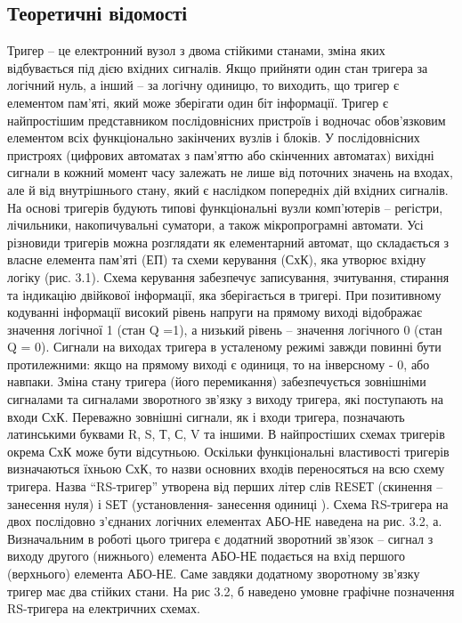\documentclass[12pt]{extarticle}
\begin{document}
\subsection*{Теоретичні відомості}
Тригер – це електронний вузол з двома стійкими станами, зміна яких
відбувається під дією вхідних сигналів. Якщо прийняти один стан тригера за
логічний нуль, а інший – за логічну одиницю, то виходить, що тригер є елементом
пам’яті, який може зберігати один біт інформації. Тригер є найпростішим
представником послідовнісних пристроїв і водночас обов’язковим елементом всіх
функціонально закінчених вузлів і блоків.
У послідовнісних пристроях (цифрових автоматах з пам’яттю або скінченних
автоматах) вихідні сигнали в кожний момент часу залежать не лише від поточних
значень на входах, але й від внутрішнього стану, який є наслідком попередніх дій
вхідних сигналів.
На основі тригерів будують типові функціональні вузли комп’ютерів –
регістри, лічильники, накопичувальні суматори, а також мікропрограмні автомати.
Усі різновиди тригерів можна розглядати як елементарний автомат, що
складається з власне елемента пам’яті (ЕП) та схеми керування (СхК), яка утворює
вхідну логіку (рис. 3.1). Схема керування забезпечує записування, зчитування,
стирання та індикацію двійкової інформації, яка зберігається в тригері.
При позитивному кодуванні інформації високий рівень напруги на прямому виході
відображає значення логічної 1 (стан Q =1), а низький рівень – значення логічного
0 (стан Q = 0). Сигнали на виходах тригера в усталеному режимі завжди повинні
бути протилежними: якщо на прямому виході є одиниця, то на інверсному - 0, або
навпаки.
Зміна стану тригера (його перемикання) забезпечується зовнішніми сигналами
та сигналами зворотного зв’язку з виходу тригера, які поступають на входи СхК.
Переважно зовнішні сигнали, як і входи тригера, позначають латинськими буквами
R, S, Т, С, V та іншими. В найпростіших схемах тригерів окрема СхК може бути
відсутньою.
Оскільки функціональні властивості тригерів визначаються їхньою СхК, то
назви основних входів переносяться на всю схему тригера.
Назва “RS-тригер” утворена від перших літер слів RЕSЕТ (скинення –
занесення нуля) і SЕТ (установлення- занесення одиниці ).
Схема RS-тригера на двох послідовно з’єднаних логічних елементах АБО-НЕ
наведена на рис. 3.2, а. Визначальним в роботі цього тригера є додатний зворотний
зв’язок – сигнал з виходу другого (нижнього) елемента АБО-НЕ подається на вхід
першого (верхнього) елемента АБО-НЕ. Саме завдяки додатному зворотному
зв’язку тригер має два стійких стани. На рис 3.2, б наведено умовне графічне
позначення RS-тригера на електричних схемах.
\end{document}
